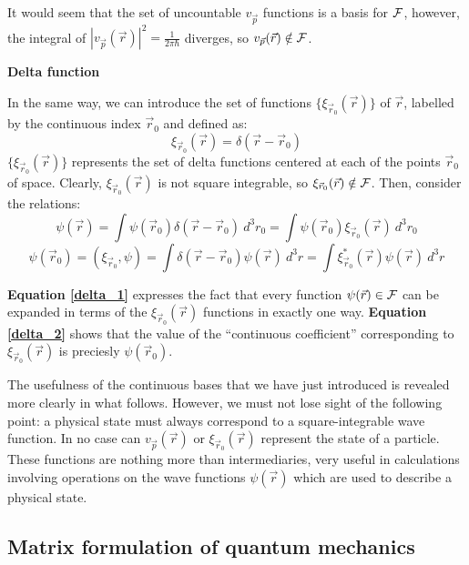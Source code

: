 It would seem that the set of uncountable $v_{\vec{p}}$ functions is a basis for $\mathcal{F}$, however, the integral of $\left|v_{\vec{p}}(\vec{r})\right|^2 = \frac{1}{2\pi\hbar}$ diverges, so $v_{\vec{p}}(\vec{r})\notin \mathcal{F}$.

\textbf{Delta function}

In the same way, we can introduce the set of functions $\{\xi_{\vec{r}_0}(\vec{r})\}$ of $\vec{r}$, labelled by the continuous index $\vec{r}_0$ and defined as:
\begin{equation}
    \xi_{\vec{r}_0}(\vec{r}) = \delta(\vec{r} - \vec{r}_0)
\end{equation}
$\{\xi_{\vec{r}_0}(\vec{r})\}$ represents the set of delta functions centered at each of the points $\vec{r}_0$ of space. Clearly, $\xi_{\vec{r}_0}(\vec{r})$ is not square integrable, so $\xi_{\vec{r}_0}(\vec{r})\notin \mathcal{F}$. Then, consider the relations:
\begin{equation} \label{delta_1}
    \psi(\vec{r}) = \int \psi(\vec{r}_0)\delta(\vec{r} - \vec{r}_0) \ d^3r_0 = \int \psi(\vec{r}_0)\xi_{\vec{r}_0}(\vec{r})\ d^3r_0
\end{equation}
\begin{equation} \label{delta_2}
    \psi(\vec{r}_0) = (\xi_{\vec{r}_0}, \psi) = \int \delta(\vec{r} - \vec{r}_0)\psi(\vec{r}) \ d^3r = \int \xi^*_{\vec{r}_0}(\vec{r})\psi(\vec{r}) \ d^3r
\end{equation}

\textbf{Equation \ref{delta_1}} expresses the fact that every function $\psi(\vec{r})\in\mathcal{F}$ can be expanded in terms of the $\xi_{\vec{r}_0}(\vec{r})$ functions in exactly one way. \textbf{Equation \ref{delta_2}} shows that the value of the ``continuous coefficient'' corresponding to $\xi_{\vec{r}_0}(\vec{r})$ is preciesly $\psi(\vec{r}_0)$. 

The usefulness of the continuous bases that we have just introduced is revealed more clearly in what follows. However, we must not lose sight of the following point: a physical state must always correspond to a square-integrable wave function. In no case can $v_{\vec{p}}(\vec{r})$ or $\xi_{\vec{r}_0}(\vec{r})$ represent the state of a particle. These functions are nothing more than intermediaries, very useful in calculations involving operations on the wave functions $\psi(\vec{r})$ which are used to describe a physical state.



\subsection{Matrix formulation of quantum mechanics}
